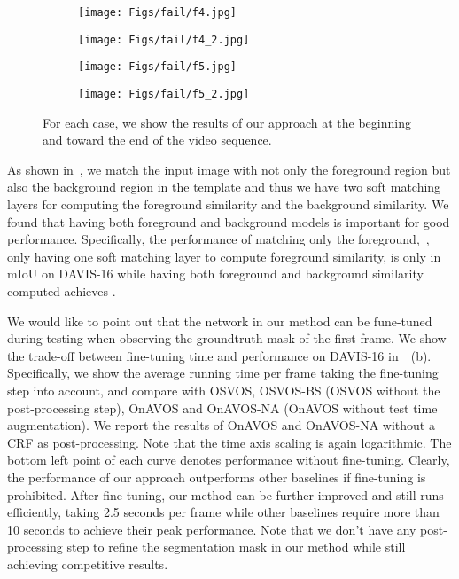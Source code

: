 \begin{figure}[t]
{}
	\label{fig:qual}
\setlength{\figwidth}{0.25\textwidth}
\begin{center}
		\begin{subfigure}[b]{0.98\figwidth}\texttt{[image: Figs/fail/f4.jpg]} \\
		\end{subfigure}
		\begin{subfigure}[b]{0.98\figwidth}\texttt{[image: Figs/fail/f4\_2.jpg]} \\
		\end{subfigure}\hfill
		\begin{subfigure}[b]{0.98\figwidth}\texttt{[image: Figs/fail/f5.jpg]} \\
		\end{subfigure}
		\begin{subfigure}[b]{0.98\figwidth}\texttt{[image: Figs/fail/f5\_2.jpg]} \\
		\end{subfigure}
	\end{center}
\caption{ For each case, we show the results of our approach at the beginning and toward the end of the video sequence.}
	\label{fig:failure}
\end{figure} 

As shown in~, we match the input image with not only the foreground region but also the background region in the template and thus we have two soft matching layers for computing the foreground similarity and the background similarity. We found that having both foreground and background models is important for good performance. Specifically, the performance of matching only the foreground,~\ie, only having one soft matching layer to compute foreground similarity, is only  in mIoU on DAVIS-16 while having both foreground and background similarity computed achieves . 

 We would like to point out that the network in our method can be fune-tuned during testing when observing the groundtruth mask of the first frame. We show the trade-off between fine-tuning time and performance on DAVIS-16 in~~(b). Specifically, we show the average running time per frame taking the fine-tuning step into account, and  compare with OSVOS, OSVOS-BS (OSVOS without the post-processing step), OnAVOS and OnAVOS-NA (OnAVOS without test time augmentation). We report the results of OnAVOS and OnAVOS-NA without a CRF as post-processing. Note that the time axis scaling is again logarithmic. The bottom left  point of each curve denotes performance without fine-tuning. Clearly, the performance of our approach outperforms other baselines if fine-tuning is prohibited. After fine-tuning, our method can be further improved and still runs efficiently, taking 2.5 seconds per frame while other baselines require more than 10 seconds to achieve their peak performance. Note that we don't have any post-processing step to refine the segmentation mask in our method while still achieving competitive results. 




